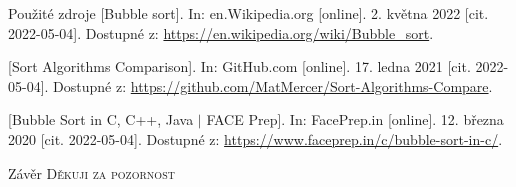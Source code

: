 \documentclass{beamer}
\begin{document}
\begin{frame}{Použité zdroje}
    [Bubble sort]. In: en.Wikipedia.org [online]. 2. května 2022 [cit. 2022-05-04]. Dostupné z: \url{https://en.wikipedia.org/wiki/Bubble_sort}.
    
    [Sort Algorithms Comparison]. In: GitHub.com [online]. 17. ledna 2021 [cit. 2022-05-04]. Dostupné z: \url{https://github.com/MatMercer/Sort-Algorithms-Compare}.
    
    [Bubble Sort in C, C++, Java $|$ FACE Prep]. In: FacePrep.in [online]. 12. března 2020 [cit. 2022-05-04]. Dostupné z: \url{https://www.faceprep.in/c/bubble-sort-in-c/}.
\end{frame}

\begin{frame}{Závěr}
    \centering
    \LARGE
    \textsc{Děkuji za pozornost}
\end{frame}
\end{document}
